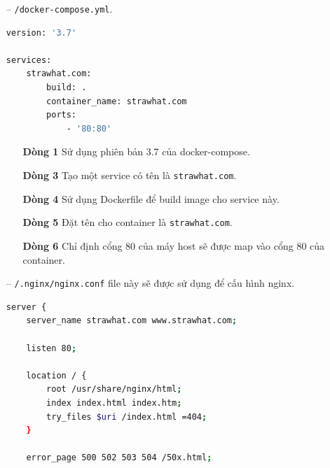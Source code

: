 \documentclass[a4paper, 11pt]{article}
\begin{document}
\begin{itemize}
    \item [--] \texttt{/docker-compose.yml}. \hfill
          \begin{lstlisting}[language=bash, caption={Nội dung file \texttt{/docker-compose.up}}]
version: '3.7'

services:
    strawhat.com:
        build: .
        container_name: strawhat.com
        ports:
            - '80:80'
\end{lstlisting}
          \begin{itemize}
              \item [\textbf{Dòng 1}] Sử dụng phiên bản 3.7 của docker-compose.
              \item [\textbf{Dòng 3}] Tạo một service có tên là \texttt{strawhat.com}.
              \item [\textbf{Dòng 4}] Sử dụng Dockerfile để build image cho service này.
              \item [\textbf{Dòng 5}] Đặt tên cho container là \texttt{strawhat.com}.
              \item [\textbf{Dòng 6}] Chỉ định cổng 80 của máy host sẽ được map vào cổng 80 của container.
          \end{itemize}
    \item [--] \texttt{/.nginx/nginx.conf} file này sẽ được sử dụng để cấu hình nginx. \hfill
          \begin{lstlisting}[language=bash, caption={Nội dung file \texttt{/.nginx/nginx.conf}}]
server {
    server_name strawhat.com www.strawhat.com;

    listen 80;

    location / {
        root /usr/share/nginx/html;
        index index.html index.htm;
        try_files $uri /index.html =404;
    }

    error_page 500 502 503 504 /50x.html;


\end{lstlisting}
\end{itemize}
\end{document}
